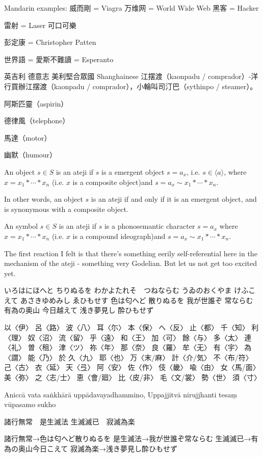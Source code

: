 Mandarin examples:
威而剛 = Viagra
万维网 = World Wide Web 
黑客 = Hacker

雷射 = Laser
可口可樂

彭定康 = Christopher Patten

世界語 = 愛斯不難讀 = Esperanto

英吉利 德意志 美利堅合眾國
Shanghainese
江摆渡（kaonpadu / comprador）-洋行買辦江摆渡（kaonpadu / comprador），小輪叫司汀巴（sythinpo / steamer）。

阿斯匹靈（aspirin）

德律風（telephone）

馬達（motor）

幽默（humour）
\begin{definition}[Ateji]
    An object $s \in S$ is an ateji if $s$ is a emergent object $s= a_{x}$, i.e. $s\in\langle a \rangle$, where $x = x_{1} * \cdots * x_{n}$ (i.e. $x$ is a composite object)and $s= a_{x} \sim x_{1} * \cdots * x_{n}$.

    In other words, an object $s$ is an ateji if and only if it is an emergent object, and is synonymous with a composite object.

    An symbol $s \in S$ is an ateji if $s$ is a phonosemantic character $s= a_{x}$ where $x = x_{1} * \cdots * x_{n}$ (i.e. $x$ is a compound ideograph)and $s=a_{x} \sim x_{1} * \cdots * x_{n}$.
\end{definition}

The first reaction I felt is that there's something eerily self-referential here in the mechanism of the ateji - something very Godelian. But let us not get too excited yet.



いろはにほへと ちりぬるを
わかよたれそ　つねならむ
うゐのおくやま けふこえて
あさきゆめみし ゑひもせす
色は匂へど 散りぬるを
我が世誰ぞ 常ならむ
有為の奥山 今日越えて
浅き夢見し 酔ひもせず



以〈伊〉	呂〈路〉	波〈八〉	耳〈尓〉	本〈保〉	へ〈反〉	止〈都〉
千〈知〉	利〈理〉	奴〈沼〉	流〈留〉	乎〈遠〉	和〈王〉	加〈可〉
餘〈与〉	多〈太〉	連〈礼〉	曽〈租〉	津〈ツ〉	祢〈年〉	那〈奈〉
良〈羅〉	牟〈无〉	有〈宇〉	為〈謂〉	能〈乃〉	於	久〈九〉
耶〈也〉	万〈末/麻〉	計〈介/気〉	不〈布/符〉	己〈古〉	衣〈延〉	天〈弖〉
阿〈安〉	佐〈作〉	伎〈畿〉	喩〈由〉	女〈馬/面〉	美〈弥〉	之〈志/士〉
恵〈會/廻〉	比〈皮/非〉	毛〈文/裳〉	勢〈世〉	須〈寸〉


Aniccā vata saṅkhārā uppādavayadhammino,
Uppajjitvā nirujjhanti tesaṃ vūpasamo sukho

諸行無常　是生滅法
生滅滅已　寂滅為楽

諸行無常→色は匂へど散りぬるを
是生滅法→我が世誰ぞ常ならむ
生滅滅已→有為の奥山今日こえて
寂滅為楽→浅き夢見し酔ひもせず
